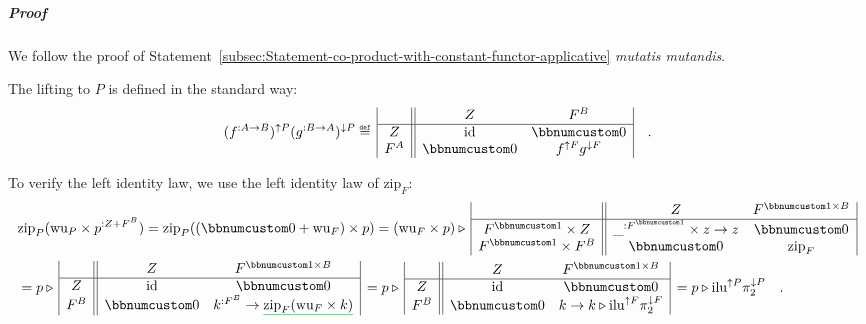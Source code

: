 \subparagraph{Proof}

We follow the proof of Statement~\ref{subsec:Statement-co-product-with-constant-functor-applicative}
\emph{mutatis mutandis}.

The lifting to $P$ is defined in the standard way:
\[
(f^{:A\rightarrow B})^{\uparrow P}(g^{:B\rightarrow A})^{\downarrow P}\triangleq\,\begin{array}{|c||cc|}
 & Z & F^{B}\\
\hline Z & \text{id} & \bbnum 0\\
F^{A} & \bbnum 0 & f^{\uparrow F}g^{\downarrow F}
\end{array}\quad.
\]

To verify the left identity law, we use the left identity law of $\text{zip}_{F}$:
\begin{align*}
 & \text{zip}_{P}(\text{wu}_{P}\times p^{:Z+F^{B}})=\text{zip}_{P}((\bbnum 0+\text{wu}_{F})\times p)=(\text{wu}_{F}\times p)\triangleright\,\begin{array}{|c||cc|}
 & Z & F^{\bbnum 1\times B}\\
\hline F^{\bbnum 1}\times Z & \_^{:F^{\bbnum 1}}\times z\rightarrow z & \bbnum 0\\
F^{\bbnum 1}\times F^{B} & \bbnum 0 & \text{zip}_{F}
\end{array}\\
 & =p\triangleright\,\begin{array}{|c||cc|}
 & Z & F^{\bbnum 1\times B}\\
\hline Z & \text{id} & \bbnum 0\\
F^{B} & \bbnum 0 & k^{:F^{B}}\rightarrow\gunderline{\text{zip}_{F}(\text{wu}_{F}\times k)}
\end{array}\,=p\triangleright\,\begin{array}{|c||cc|}
 & Z & F^{\bbnum 1\times B}\\
\hline Z & \text{id} & \bbnum 0\\
F^{B} & \bbnum 0 & k\rightarrow k\triangleright\text{ilu}^{\uparrow F}\pi_{2}^{\downarrow F}
\end{array}\,=p\triangleright\text{ilu}^{\uparrow P}\pi_{2}^{\downarrow P}\quad.
\end{align*}


